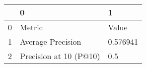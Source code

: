 \begin{tabular}{lll}
\toprule
{} &                       0 &         1 \\
\midrule
0 &                  Metric &     Value \\
1 &       Average Precision &  0.576941 \\
2 &  Precision at 10 (P@10) &       0.5 \\
\bottomrule
\end{tabular}
